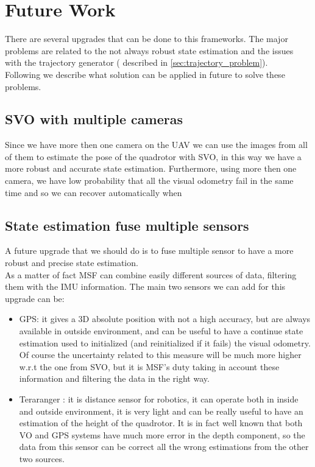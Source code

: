 \section{Future Work}\label{sec:future_work}
There are several upgrades that can be done to this frameworks. The major problems are related to the not always robust state estimation and the issues with the trajectory generator ( described in \ref{sec:trajectory_problem}).\\
Following we describe what solution can be applied in future to solve these problems.

\subsection{SVO with multiple cameras}
Since we have more then one camera on the UAV we can use the images from all of them to estimate the pose of the quadrotor with SVO, in this way we have a more robust and accurate state estimation. Furthermore, using more then one camera, we have low probability that all the visual odometry fail in the same time and so we can recover automatically when 


\subsection{State estimation fuse multiple sensors}
A future upgrade that we should do is to fuse multiple sensor to have a more robust and precise state estimation.\\
As a matter of fact MSF can combine easily different sources of data, filtering them with the IMU information.
The main two sensors we can add for this upgrade can be:
\begin{itemize}
\item GPS: it gives a 3D absolute position with not a high accuracy, but are always available in outside environment, and can be useful to have a continue state estimation used to initialized (and reinitialized if it fails) the visual odometry. Of course the uncertainty related to this measure will be much more higher w.r.t the one from SVO, but it is MSF's duty taking in account these information and filtering the data in the right way.
\item Teraranger \cite{teraranger}: it is distance sensor for robotics, it can operate both in inside and outside environment, it is very light and can be really useful to have an estimation of the height of the quadrotor. It is in fact well known that both VO and GPS systems have much more error in the depth component, so the data from this sensor can be correct all the wrong estimations from the other two sources. 
\end{itemize}

